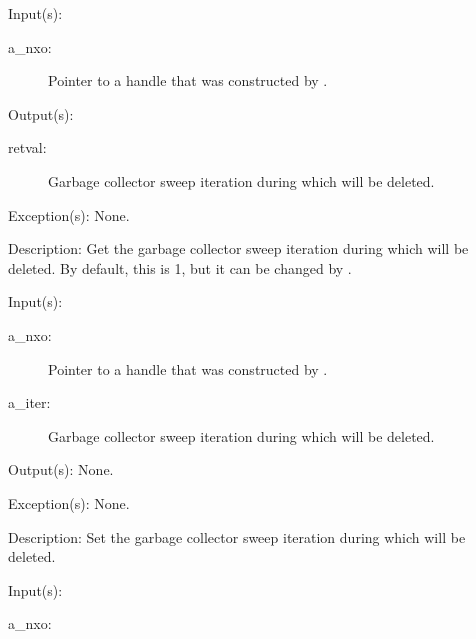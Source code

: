 \begin{capi}
\begin{capilist}
	\item[Input(s): ]
		\begin{description}\item[]
		\item[a\_nxo: ]
			Pointer to a handle  that was constructed
			by .
		\end{description}
	\item[Output(s): ]
		\begin{description}\item[]
		\item[retval: ]
			Garbage collector sweep iteration during which
			 will be deleted.
		\end{description}
	\item[Exception(s): ] None.
	\item[Description: ]
		Get the garbage collector sweep iteration during which
		 will be deleted.  By default, this is 1, but it
		can be changed by .
	\end{capilist}
\label{nxm_iter_set}
	\begin{capilist}
	\item[Input(s): ]
		\begin{description}\item[]
		\item[a\_nxo: ]
			Pointer to a handle  that was constructed
			by .
		\item[a\_iter: ]
			Garbage collector sweep iteration during which
			 will be deleted.
		\end{description}
	\item[Output(s): ] None.
	\item[Exception(s): ] None.
	\item[Description: ]
		Set the garbage collector sweep iteration during which
		 will be deleted.
	\end{capilist}
\label{nxm_pre_unload_hook_get}
	\begin{capilist}
	\item[Input(s): ]
		\begin{description}\item[]
		\item[a\_nxo: ]

\end{description}
\end{capilist}
\end{capi}
